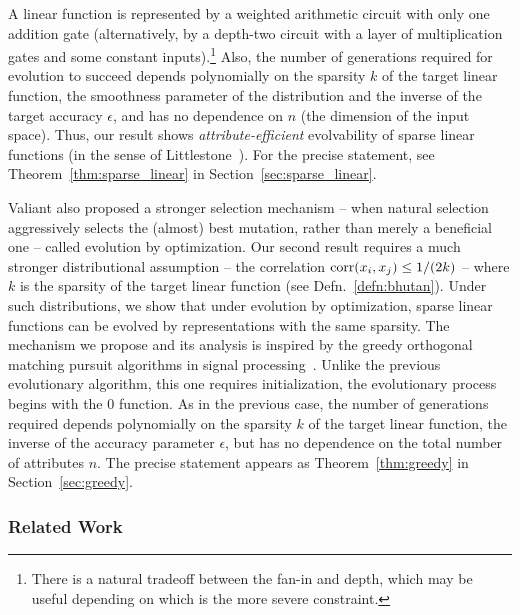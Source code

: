 A linear function is represented by a weighted arithmetic circuit with only one
addition gate (alternatively, by a depth-two circuit with a layer of
multiplication gates and some constant inputs).\footnote{There is a natural
tradeoff between the fan-in and depth, which may be useful depending on which is
the more severe constraint.} Also, the number of generations required for
evolution to succeed depends polynomially on the sparsity $k$ of the target
linear function, the smoothness parameter of the distribution and the inverse of
the target accuracy $\epsilon$, and has no dependence on $n$ (the dimension of
the input space). Thus, our result shows \emph{attribute-efficient} evolvability
of sparse linear functions (in the sense of
Littlestone~\cite{Littlestone:1988}). For the precise statement, see
Theorem~\ref{thm:sparse_linear} in Section~\ref{sec:sparse_linear}.

Valiant also proposed a stronger selection mechanism -- when natural selection
aggressively selects the (almost) best mutation, rather than merely a beneficial
one -- called evolution by optimization. Our second result requires a much
stronger distributional assumption -- the correlation $\mathrm{corr}(x_i, x_j) \leq
1/(2k)$ -- where $k$ is the sparsity of the target  linear function (see
Defn.~\ref{defn:bhutan}). Under such distributions, we show that under evolution
by optimization, sparse linear functions can be evolved by representations with
the same sparsity. The mechanism we propose and its analysis is inspired by the
greedy orthogonal matching pursuit algorithms in signal
processing~\cite{Donoho:2006-recovery,Tropp:2004-greed}. Unlike the previous
evolutionary algorithm, this one requires initialization, \ie the evolutionary
process begins with the $0$ function. As in the previous case, the number of
generations required depends polynomially on the sparsity $k$ of the target
linear function, the inverse of the accuracy parameter $\epsilon$, but has no
dependence on the total number of attributes $n$. The precise statement appears
as Theorem~\ref{thm:greedy} in Section~\ref{sec:greedy}.

\subsubsection*{Related Work}

